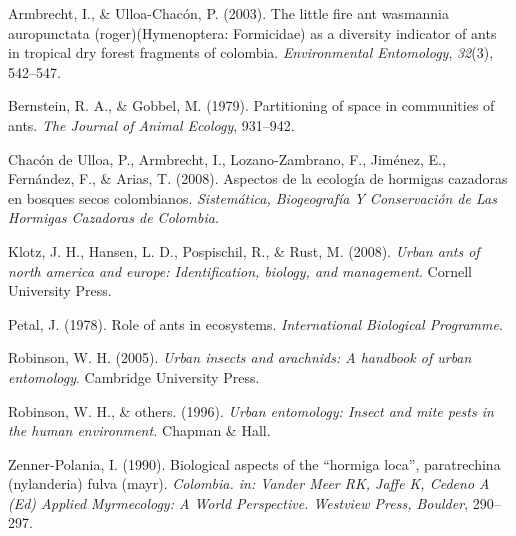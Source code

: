 \documentclass[11pt,]{article}
\begin{document}
\hypertarget{ref-armbrecht2003little}{}
Armbrecht, I., \& Ulloa-Chacón, P. (2003). The little fire ant wasmannia
auropunctata (roger)(Hymenoptera: Formicidae) as a diversity indicator
of ants in tropical dry forest fragments of colombia.
\emph{Environmental Entomology}, \emph{32}(3), 542--547.

\hypertarget{ref-bernstein1979partitioning}{}
Bernstein, R. A., \& Gobbel, M. (1979). Partitioning of space in
communities of ants. \emph{The Journal of Animal Ecology}, 931--942.

\hypertarget{ref-chacon2008aspectos}{}
Chacón de Ulloa, P., Armbrecht, I., Lozano-Zambrano, F., Jiménez, E.,
Fernández, F., \& Arias, T. (2008). Aspectos de la ecología de hormigas
cazadoras en bosques secos colombianos. \emph{Sistemática, Biogeografía
Y Conservación de Las Hormigas Cazadoras de Colombia}.

\hypertarget{ref-klotz2008urban}{}
Klotz, J. H., Hansen, L. D., Pospischil, R., \& Rust, M. (2008).
\emph{Urban ants of north america and europe: Identification, biology,
and management}. Cornell University Press.

\hypertarget{ref-petal1978role}{}
Petal, J. (1978). Role of ants in ecosystems. \emph{International
Biological Programme}.

\hypertarget{ref-robinson2005urban}{}
Robinson, W. H. (2005). \emph{Urban insects and arachnids: A handbook of
urban entomology}. Cambridge University Press.

\hypertarget{ref-robinson1996urban}{}
Robinson, W. H., \& others. (1996). \emph{Urban entomology: Insect and
mite pests in the human environment.} Chapman \& Hall.

\hypertarget{ref-zenner1990biological}{}
Zenner-Polania, I. (1990). Biological aspects of the ``hormiga loca'',
paratrechina (nylanderia) fulva (mayr). \emph{Colombia. in: Vander Meer
RK, Jaffe K, Cedeno A (Ed) Applied Myrmecology: A World Perspective.
Westview Press, Boulder}, 290--297.




\newpage
\singlespacing 
\end{document}
